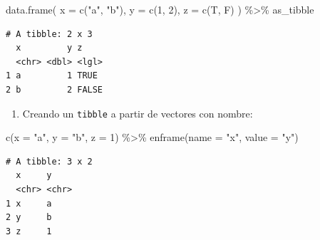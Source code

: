 \documentclass[
  letterpaper,
  DIV=11,
  numbers=noendperiod]{scrreprt}
\newenvironment{Shaded}{\begin{snugshade}}{\end{snugshade}}
\newcommand{\AttributeTok}[1]{\textcolor[rgb]{0.40,0.45,0.13}{#1}}
\newcommand{\DecValTok}[1]{\textcolor[rgb]{0.68,0.00,0.00}{#1}}
\newcommand{\FunctionTok}[1]{\textcolor[rgb]{0.28,0.35,0.67}{#1}}
\newcommand{\NormalTok}[1]{\textcolor[rgb]{0.00,0.23,0.31}{#1}}
\newcommand{\SpecialCharTok}[1]{\textcolor[rgb]{0.37,0.37,0.37}{#1}}
\newcommand{\StringTok}[1]{\textcolor[rgb]{0.13,0.47,0.30}{#1}}
\providecommand{\tightlist}{%
  \setlength{\itemsep}{0pt}\setlength{\parskip}{0pt}}\usepackage{longtable,booktabs,array}
\begin{document}
\begin{Shaded}
\begin{Highlighting}[]
\FunctionTok{data.frame}\NormalTok{(}
  \AttributeTok{x =} \FunctionTok{c}\NormalTok{(}\StringTok{"a"}\NormalTok{, }\StringTok{"b"}\NormalTok{),}
  \AttributeTok{y =} \FunctionTok{c}\NormalTok{(}\DecValTok{1}\NormalTok{, }\DecValTok{2}\NormalTok{),}
  \AttributeTok{z =} \FunctionTok{c}\NormalTok{(T, F)}
\NormalTok{) }\SpecialCharTok{\%\textgreater{}\%} 
\NormalTok{as\_tibble}
\end{Highlighting}
\end{Shaded}

\begin{verbatim}
# A tibble: 2 x 3
  x         y z    
  <chr> <dbl> <lgl>
1 a         1 TRUE 
2 b         2 FALSE
\end{verbatim}

\begin{enumerate}
\def\labelenumi{\alph{enumi}.}
\setcounter{enumi}{3}
\tightlist
\item
  Creando un \texttt{tibble} a partir de vectores con nombre:
\end{enumerate}

\begin{Shaded}
\begin{Highlighting}[]
\FunctionTok{c}\NormalTok{(}\AttributeTok{x =} \StringTok{"a"}\NormalTok{, }\AttributeTok{y =} \StringTok{"b"}\NormalTok{, }\AttributeTok{z =} \DecValTok{1}\NormalTok{) }\SpecialCharTok{\%\textgreater{}\%}
  \FunctionTok{enframe}\NormalTok{(}\AttributeTok{name =} \StringTok{"x"}\NormalTok{, }\AttributeTok{value =} \StringTok{"y"}\NormalTok{)}
\end{Highlighting}
\end{Shaded}

\begin{verbatim}
# A tibble: 3 x 2
  x     y    
  <chr> <chr>
1 x     a    
2 y     b    
3 z     1    
\end{verbatim}
\end{document}
